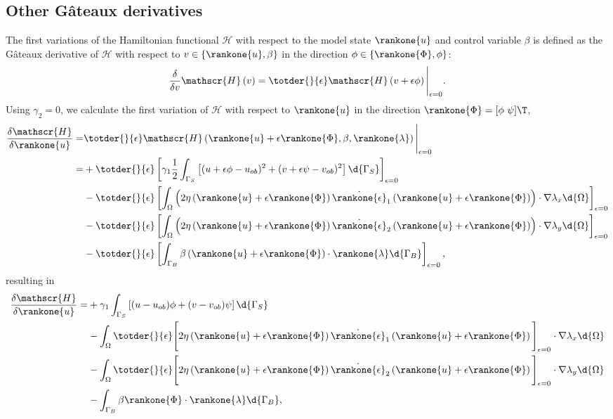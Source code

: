 \subsection{Other G\^{a}teaux derivatives}

The first variations of the Hamiltonian functional $\mathscr{H}$ with respect to the model state $\rankone{u}$ and control variable $\beta$ is defined as the G\^{a}teaux derivative of $\mathscr{H}$ with respect to $v \in \{\rankone{u}, \beta\}$ in the direction $\phi \in \{\rankone{\Phi}, \phi\}$: 
\begin{align*}
 \frac{\delta}{\delta v} \mathscr{H}\left( v \right) = \totder{}{\epsilon} \mathscr{H} \left(v + \epsilon \phi \right) \Bigg|_{\epsilon = 0}.
\end{align*} 
Using $\gamma_2 = 0$, we calculate the first variation of $\mathscr{H}$ with respect to $\rankone{u}$ in the direction $\rankone{\Phi} = [\phi\ \psi]\T$,
\begin{align*}
 \frac{\delta \mathscr{H}}{\delta \rankone{u}} =& \totder{}{\epsilon} \mathscr{H} \left(\rankone{u} + \epsilon \rankone{\Phi}, \beta, \rankone{\lambda} \right) \Bigg|_{\epsilon = 0} \\
  = &+ \totder{}{\epsilon} \left[ \gamma_1 \frac{1}{2} \int_{\Gamma_S} \left[ (u + \epsilon \phi - u_{ob})^2 + (v + \epsilon \psi - v_{ob})^2 \right] \d{\Gamma_S} \right]_{\epsilon = 0} \\ 
  &- \totder{}{\epsilon} \left[ \int_{\Omega} \left( 2\eta\left(\rankone{u} + \epsilon \rankone{\Phi} \right) \dot{\rankone{\epsilon}}_1\left(\rankone{u} + \epsilon\rankone{\Phi} \right) \right) \cdot \nabla \lambda_x \d{\Omega} \right]_{\epsilon = 0} \\
  &- \totder{}{\epsilon} \left[ \int_{\Omega} \left( 2\eta \left(\rankone{u} + \epsilon \rankone{\Phi} \right) \dot{\rankone{\epsilon}}_2\left(\rankone{u} + \epsilon \rankone{\Phi} \right) \right) \cdot \nabla \lambda_y \d{\Omega} \right]_{\epsilon = 0} \\
  &- \totder{}{\epsilon} \left[ \int_{\Gamma_B} \beta \left(\rankone{u} + \epsilon \rankone{\Phi} \right) \cdot \rankone{\lambda} \d{\Gamma_B} \right]_{\epsilon = 0},
\end{align*}
resulting in
\begin{align*}
 \frac{\delta \mathscr{H}}{\delta \rankone{u}} =
  &+ \gamma_1 \int_{\Gamma_S} \left[ (u - u_{ob})\phi + (v - v_{ob})\psi \right] \d{\Gamma_S} \\ 
  &- \int_{\Omega} \totder{}{\epsilon} \Bigg[ 2\eta\left(\rankone{u} + \epsilon \rankone{\Phi} \right) \dot{\rankone{\epsilon}}_1\left(\rankone{u} + \epsilon\rankone{\Phi} \right) \Bigg]_{\epsilon = 0} \cdot \nabla \lambda_x \d{\Omega} \\
  &- \int_{\Omega} \totder{}{\epsilon} \Bigg[ 2\eta \left(\rankone{u} + \epsilon \rankone{\Phi} \right) \dot{\rankone{\epsilon}}_2\left(\rankone{u} + \epsilon \rankone{\Phi} \right) \Bigg]_{\epsilon = 0} \cdot \nabla \lambda_y \d{\Omega} \\
  &- \int_{\Gamma_B} \beta \rankone{\Phi} \cdot \rankone{\lambda} \d{\Gamma_B},
\end{align*}
